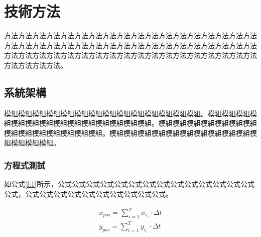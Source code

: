 \chapter{技術方法}

方法方法方法方法方法方法方法方法方法方法方法方法方法方法方法方法方法方法方法方法方法方法方法方法方法方法方法方法方法方法方法方法方法方法方法方法方法方法方法方法方法方法方法方法方法方法方法方法方法方法方法方法方法方法方法方法方法方法。

\section{系統架構}
模組模組模組模組模組模組模組模組模組模組模組模組模組模組。模組模組模組模組模組模組模組模組模組模組模組模組模組模組。模組模組模組模組模組模組模組模組模組模組模組模組模組模組。模組模組模組模組模組模組模組模組模組模組模組模組模組模組。

\subsection{方程式測試}
如公式\ref{f:1}所示，公式公式公式公式公式公式公式公式公式公式公式公式公式公式公式，公式公式公式公式公式公式公式公式公式公式。

\begin{equation}
\begin{aligned}
x_{pos} = \sum_{i=1}^{T} x_{v_{i}} \cdot \Delta t \\
y_{pos} = \sum_{i=1}^{T} y_{v_{i}}  \cdot \Delta t \label{f:1}
\end{aligned}
\end{equation}

